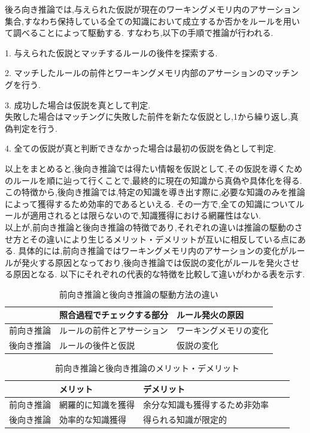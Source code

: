 \documentclass[uplatex,12pt]{jsarticle}
\begin{document}
後ろ向き推論では,与えられた仮説が現在のワーキングメモリ内のアサーション集合,すなわち保持している全ての知識において成立するか否かをルールを用いて調べることによって駆動する.
すなわち,以下の手順で推論が行われる.
\begin{description}
    \item 1. 与えられた仮説とマッチするルールの後件を探索する.
    \item 2. マッチしたルールの前件とワーキングメモリ内部のアサーションのマッチングを行う.
    \item 3. 成功した場合は仮説を真として判定. \\
             失敗した場合はマッチングに失敗した前件を新たな仮説とし,1から繰り返し,真偽判定を行う.
    \item 4. 全ての仮説が真と判断できなかった場合は最初の仮説を偽として判定.
\end{description}
以上をまとめると,後向き推論では得たい情報を仮説として,その仮説を導くためのルールを順に辿って行くことで,最終的に現在の知識から真偽や具体化を得る.
この特徴から,後向き推論では,特定の知識を導き出す際に,必要な知識のみを推論によって獲得するため効率的であるといえる.
その一方で,全ての知識についてルールが適用されるとは限らないので,知識獲得における網羅性はない. \\

以上が,前向き推論と後向き推論の特徴であり,それぞれの違いは推論の駆動のさせ方とその違いにより生じるメリット・デメリットが互いに相反している点にある.
具体的には,前向き推論ではワーキングメモリ内のアサーションの変化がルールが発火する原因となっており,後向き推論では仮説の変化がルールを発火させる原因となる.
以下にそれぞれの代表的な特徴を比較して違いがわかる表を示す.

\begin{table}[!hbt]
    \begin{tabular}{|l|l|l|}
    \hline
              & 照合過程でチェックする部分 & ルール発火の原因 \\ \hline
    前向き推論 & ルールの前件とアサーション & ワーキングメモリの変化 \\ \hline
    後向き推論 & ルールの後件と仮説     & 仮説の変化 \\ \hline
    \end{tabular}
    \caption{前向き推論と後向き推論の駆動方法の違い}
\end{table}

\begin{table}[!hbt]
    \begin{tabular}{|l|l|l|l|l|}
    \hline
              & メリット      & デメリット           \\ \hline
    前向き推論 & 網羅的に知識を獲得 & 余分な知識も獲得するため非効率 \\ \hline
    後向き推論 & 効率的な知識獲得  & 得られる知識が限定的      \\ \hline
    \end{tabular}
    \caption{前向き推論と後向き推論のメリット・デメリット}
\end{table}
\end{document}
